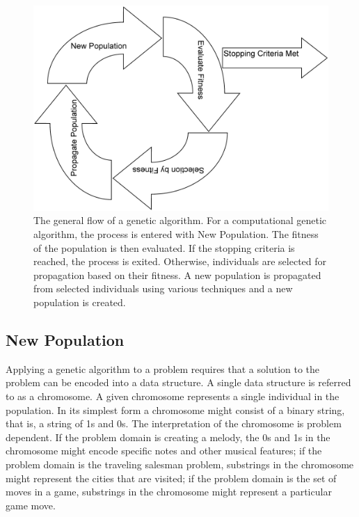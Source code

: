 \begin{figure}[htp]
\centerline{\includegraphics[width=1.0\columnwidth]{Figures/GAFlow.png}}
\caption[Genetic Algorithm Flow]{The general flow of a genetic algorithm. For a
computational genetic algorithm, the process is entered with New Population.
The fitness of the population is then evaluated. If the stopping criteria is
reached, the process is exited. Otherwise, individuals are selected for
propagation based on their fitness. A new population is propagated from
selected individuals using various techniques and a new population is created.}
\label{figure-gaflow}
\end{figure}

\subsection{New Population}

Applying a genetic algorithm to a problem requires that a solution to the
problem can be encoded into a data structure. A single data structure is
referred to as a chromosome. A given chromosome represents a single individual
in the population. In its simplest form a chromosome might consist of a binary
string, that is, a string of 1s and 0s. The interpretation of the chromosome is
problem dependent. If the problem domain is creating a melody, the 0s and 1s in
the chromosome might encode specific notes and other musical features; if the
problem domain is the traveling salesman problem, substrings in the chromosome
might represent the cities that are visited; if the problem domain is the set of
moves in a game, substrings in the chromosome might represent a particular game
move.

